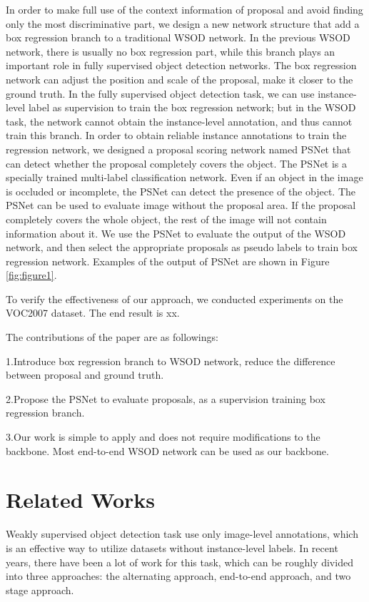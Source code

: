 \documentclass[final,3p,times,twocolumn]{elsarticle}
\begin{document}
In order to make full use of the context information of proposal and avoid finding only the most discriminative part, we design a new network structure that add a box regression branch to a traditional WSOD network. In the previous WSOD network, there is usually no box regression part, while this branch plays an important role in fully supervised object detection networks. The box regression network can adjust the position and scale of the proposal, make it closer to the ground truth. In the fully supervised object detection task, we can use instance-level label as supervision to train the box regression network; but in the WSOD task, the network cannot obtain the instance-level annotation, and thus cannot train this branch. In order to obtain reliable instance annotations to train the regression network, we designed a proposal scoring network named PSNet that can detect whether the proposal completely covers the object. The PSNet is a specially trained multi-label classification network. Even if an object in the image is occluded or incomplete, the PSNet can detect the presence of the object. The PSNet can be used to evaluate image without the proposal area. If the proposal completely covers the whole object, the rest of the image will not contain information about it. We use the PSNet to evaluate the output of the WSOD network, and then select the appropriate proposals as pseudo labels to train box regression network. Examples of the output of PSNet are shown in Figure \ref{fig:figure1}.

To verify the effectiveness of our approach, we conducted experiments on the VOC2007 dataset. The end result is xx.

The contributions of the paper are as followings:

1.Introduce box regression branch to WSOD network, reduce the difference between proposal and ground truth.

2.Propose the PSNet to evaluate proposals, as a supervision training box regression branch.

3.Our work is simple to apply and does not require modifications to the backbone. Most end-to-end WSOD network can be used as our backbone.


\section{Related Works}

Weakly supervised object detection task use only image-level annotations, which is an effective way to utilize datasets without instance-level labels. In recent years, there have been a lot of work for this task, which can be roughly divided into three approaches: the alternating approach, end-to-end approach, and two stage approach.
\end{document}
